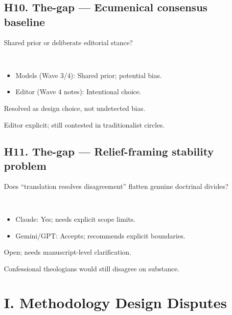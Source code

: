 \documentclass[11pt,letterpaper]{article}
\begin{document}
\subsection{H10. The-gap --- Ecumenical consensus baseline}

\begin{reflist}
\item[Dispute:] Shared prior or deliberate editorial stance?
\item[Positions:]~
  \begin{itemize}[nosep]
    \item Models (Wave 3/4): Shared prior; potential bias.
    \item Editor (Wave 4 notes): Intentional choice.
  \end{itemize}
\item[Status:] Resolved as design choice, not undetected bias.
\item[Evidence:] Editor explicit; still contested in traditionalist circles.
\end{reflist}

\subsection{H11. The-gap --- Relief-framing stability problem}

\begin{reflist}
\item[Dispute:] Does ``translation resolves disagreement'' flatten genuine doctrinal divides?
\item[Positions:]~
  \begin{itemize}[nosep]
    \item Claude: Yes; needs explicit scope limits.
    \item Gemini/GPT: Accepts; recommends explicit boundaries.
  \end{itemize}
\item[Status:] Open; needs manuscript-level clarification.
\item[Evidence:] Confessional theologians would still disagree on substance.
\end{reflist}

\section{I. Methodology Design Disputes}
\end{document}
